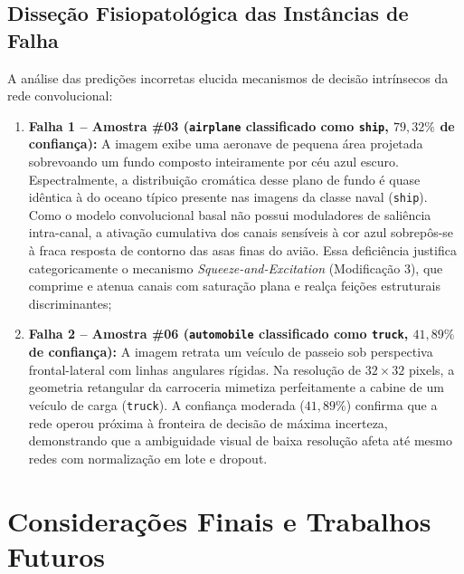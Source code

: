 \documentclass[runningheads]{llncs}
\begin{document}
\subsection{Disse\c{c}\~{a}o Fisiopatol\'{o}gica das Inst\^{a}ncias de Falha}
A an\'{a}lise das predi\c{c}\~{o}es incorretas elucida mecanismos de decis\~{a}o intr\'{i}nsecos da rede convolucional:
\begin{enumerate}
    \item \textbf{Falha 1 -- Amostra \#03 (\texttt{airplane} classificado como \texttt{ship}, $79{,}32\%$ de confian\c{c}a):}
    A imagem exibe uma aeronave de pequena \'{a}rea projetada sobrevoando um fundo composto inteiramente por c\'{e}u azul escuro. Espectralmente, a distribui\c{c}\~{a}o crom\'{a}tica desse plano de fundo \'{e} quase id\^{e}ntica \`{a} do oceano t\'{i}pico presente nas imagens da classe naval (\texttt{ship}). Como o modelo convolucional basal n\~{a}o possui moduladores de sali\^{e}ncia intra-canal, a ativa\c{c}\~{a}o cumulativa dos canais sens\'{i}veis \`{a} cor azul sobrep\^{o}s-se \`{a} fraca resposta de contorno das asas finas do avi\~{a}o. Essa defici\^{e}ncia justifica categoricamente o mecanismo \textit{Squeeze-and-Excitation} (Modifica\c{c}\~{a}o 3), que comprime e atenua canais com satura\c{c}\~{a}o plana e real\c{c}a fei\c{c}\~{o}es estruturais discriminantes;
    \item \textbf{Falha 2 -- Amostra \#06 (\texttt{automobile} classificado como \texttt{truck}, $41{,}89\%$ de confian\c{c}a):}
    A imagem retrata um ve\'{i}culo de passeio sob perspectiva frontal-lateral com linhas angulares r\'{i}gidas. Na resolu\c{c}\~{a}o de $32 \times 32$ pixels, a geometria retangular da carroceria mimetiza perfeitamente a cabine de um ve\'{i}culo de carga (\texttt{truck}). A confian\c{c}a moderada ($41{,}89\%$) confirma que a rede operou pr\'{o}xima \`{a} fronteira de decis\~{a}o de m\'{a}xima incerteza, demonstrando que a ambiguidade visual de baixa resolu\c{c}\~{a}o afeta at\'{e} mesmo redes com normaliza\c{c}\~{a}o em lote e dropout.
\end{enumerate}

\section{Considera\c{c}\~{o}es Finais e Trabalhos Futuros}
\label{sec:conclusao}
\end{document}
